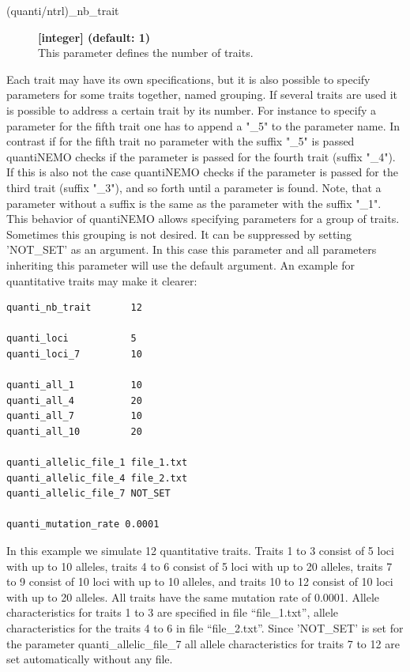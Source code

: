 \documentclass[letterpaper,12pt,oneside]{book}
\begin{document}
\begin{description}
\item[(quanti/ntrl)\_nb\_trait] \textbf{[integer] (default: 1)}\\
This parameter defines the number of traits.
\end{description}

Each trait may have its own specifications, but it is also possible to specify parameters for some traits together, named grouping. If several traits are used it is possible to address a certain trait by its number. For instance to specify a parameter for the fifth trait one has to append a \textsf{"\_5"} to the parameter name. In contrast if for the fifth trait no parameter with the suffix \textsf{"\_5"} is passed quantiNEMO checks if the parameter is passed for the fourth trait (suffix \textsf{"\_4"}). If this is also not the case quantiNEMO checks if the parameter is passed for the third trait (suffix \textsf{"\_3"}), and so forth until a parameter is found. Note, that a parameter without a suffix is the same as the parameter with the suffix  \textsf{"\_1"}. This behavior of quantiNEMO allows specifying parameters for a group of traits. Sometimes this grouping is not desired. It can be suppressed by setting 'NOT\_SET' as an argument. In this case this parameter and all parameters inheriting this parameter will use the default argument. An example for quantitative traits may make it clearer:
\begin{lstlisting}[frame=single]
quanti_nb_trait       12
	
quanti_loci           5
quanti_loci_7         10

quanti_all_1          10
quanti_all_4          20
quanti_all_7          10
quanti_all_10         20

quanti_allelic_file_1 file_1.txt  
quanti_allelic_file_4 file_2.txt  
quanti_allelic_file_7 NOT_SET  

quanti_mutation_rate 0.0001
\end{lstlisting} 
In this example we simulate 12 quantitative traits. Traits 1 to 3 consist of 5 loci with up to 10 alleles, traits 4 to 6 consist of 5 loci with up to 20 alleles, traits 7 to 9 consist of 10 loci with up to 10 alleles, and traits 10 to 12 consist of 10 loci with up to 20 alleles. All traits have the same mutation rate of 0.0001. Allele characteristics for traits 1 to 3 are specified in file “file\_1.txt”, allele characteristics for the traits 4 to 6 in file “file\_2.txt”. Since 'NOT\_SET' is set for the parameter \textsf{ quanti\_allelic\_file\_7} all allele characteristics for traits 7 to 12 are set automatically without any file. \\
\end{document}
